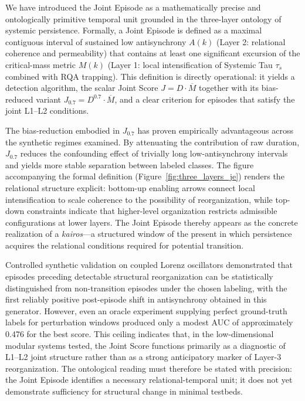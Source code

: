 We have introduced the Joint Episode as a mathematically precise and ontologically primitive temporal unit grounded in the three-layer ontology of systemic persistence. Formally, a Joint Episode is defined as a maximal contiguous interval of sustained low antisynchrony $A(k)$ (Layer 2: relational coherence and permeability) that contains at least one significant excursion of the critical-mass metric $M(k)$ (Layer 1: local intensification of Systemic Tau $\tau_s$ combined with RQA trapping). This definition is directly operational: it yields a detection algorithm, the scalar Joint Score $J = D \cdot \overline{M}$ together with its bias-reduced variant $J_{0.7} = D^{0.7} \cdot \overline{M}$, and a clear criterion for episodes that satisfy the joint L1--L2 conditions.

The bias-reduction embodied in $J_{0.7}$ has proven empirically advantageous across the synthetic regimes examined. By attenuating the contribution of raw duration, $J_{0.7}$ reduces the confounding effect of trivially long low-antisynchrony intervals and yields more stable separation between labeled classes. The figure accompanying the formal definition (Figure~\ref{fig:three_layers_je}) renders the relational structure explicit: bottom-up enabling arrows connect local intensification to scale coherence to the possibility of reorganization, while top-down constraints indicate that higher-level organization restricts admissible configurations at lower layers. The Joint Episode thereby appears as the concrete realization of a \textit{kairos}---a structured window of the present in which persistence acquires the relational conditions required for potential transition.

Controlled synthetic validation on coupled Lorenz oscillators demonstrated that episodes preceding detectable structural reorganization can be statistically distinguished from non-transition episodes under the chosen labeling, with the first reliably positive post-episode shift in antisynchrony obtained in this generator. However, even an oracle experiment supplying perfect ground-truth labels for perturbation windows produced only a modest AUC of approximately 0.476 for the best score. This ceiling indicates that, in the low-dimensional modular systems tested, the Joint Score functions primarily as a diagnostic of L1--L2 joint structure rather than as a strong anticipatory marker of Layer-3 reorganization. The ontological reading must therefore be stated with precision: the Joint Episode identifies a necessary relational-temporal unit; it does not yet demonstrate sufficiency for structural change in minimal testbeds.

